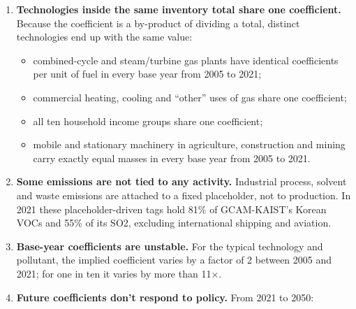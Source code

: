 \begin{enumerate}
  Eleven GCAM-KAIST totals reproduce CAPSS category totals to within 0.12\%.
  Two qualifications:

  \begin{itemize}
  \tightlist
  \item
    CEDS rescales by sector \emph{group}, so exact agreement appears only where
    a group lines up with a CAPSS category.
  \item
    Every CEDS release recent enough for GCAM's 2021 base year also rescales
    Korea a second time, to another inventory (EDGAR-HTAP), for 2000--2018.
    That second step doesn't touch 2021, but it does cover 2015 (B5.3).
  \end{itemize}
\item
  \textbf{Technologies
  inside
  the same
  inventory
  total
  share
  one
  coefficient.}
  Because
  the
  coefficient
  is a
  by-product
  of
  dividing
  a total,
  distinct
  technologies
  end up
  with the
  same
  value:

  \begin{itemize}
  \tightlist
  \item
    combined-cycle
    and
    steam/turbine
    gas
    plants
    have
    identical
    coefficients
    per
    unit
    of
    fuel
    in
    every
    base
    year
    from
    2005
    to
    2021;
  \item
    commercial
    heating,
    cooling
    and
    ``other''
    uses
    of gas
    share
    one
    coefficient;
  \item
    all
    ten
    household
    income
    groups
    share
    one
    coefficient;
  \item
    mobile
    and
    stationary
    machinery
    in
    agriculture,
    construction
    and
    mining
    carry
    exactly
    equal
    masses
    in
    every
    base
    year
    from
    2005
    to
    2021.
  \end{itemize}
\item
  \textbf{Some
  emissions
  are not
  tied to
  any
  activity.}
  Industrial
  process,
  solvent
  and
  waste
  emissions
  are
  attached
  to a
  fixed
  placeholder,
  not to
  production.
  In 2021
  these
  placeholder-driven
  tags
  hold
  81\% of
  GCAM-KAIST's
  Korean
  VOCs and
  55\% of
  its SO2,
  excluding
  international
  shipping
  and
  aviation.
\item
  \textbf{Base-year
  coefficients
  are
  unstable.}
  For the
  typical
  technology
  and
  pollutant,
  the
  implied
  coefficient
  varies
  by a
  factor
  of 2
  between
  2005 and
  2021;
  for one
  in ten
  it
  varies
  by more
  than
  11×.
\item
  \textbf{Future
  coefficients
  don't
  respond
  to
  policy.}
  From
  2021 to
  2050:


\end{enumerate}
